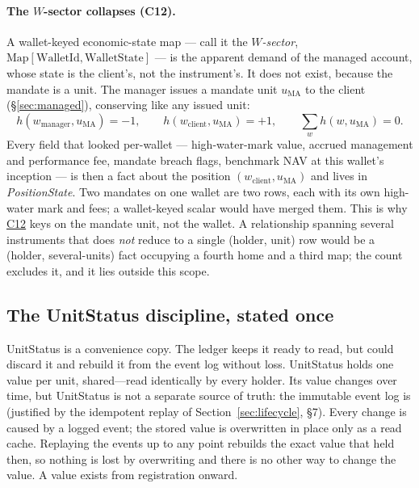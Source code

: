 \paragraph{The $W$-sector collapses (C12).}
A wallet-keyed economic-state map --- call it the \emph{$W$-sector},
$\mathrm{Map}[\mathrm{WalletId},\mathrm{WalletState}]$ --- is the apparent demand of the
managed account, whose state is the client's, not the instrument's. It does not exist,
because the mandate is a unit. The manager issues a mandate unit $u_{\mathrm{MA}}$ to the
client (\S\ref{sec:managed}), conserving like any issued unit:
\[
h(w_{\mathrm{manager}},u_{\mathrm{MA}})=-1,\qquad
h(w_{\mathrm{client}},u_{\mathrm{MA}})=+1,\qquad
\sum_{w}h(w,u_{\mathrm{MA}})=0 .
\]
Every field that looked per-wallet --- high-water-mark value, accrued management and
performance fee, mandate breach flags, benchmark NAV at this wallet's inception --- is then
a fact about the position $(w_{\mathrm{client}},u_{\mathrm{MA}})$ and lives in
\emph{PositionState}. Two mandates on one wallet are two rows, each with its own
high-water mark and fees; a wallet-keyed scalar would have merged them. This is why
\hyperref[cond:C12]{C12} keys on the mandate unit, not the wallet. A relationship spanning
several instruments that does \emph{not} reduce to a single (holder, unit) row would be a
(holder, several-units) fact occupying a fourth home and a third map; the count excludes
it, and it lies outside this scope.

\subsection{The UnitStatus discipline, stated once}
\label{sec:sec04-unitstatus}

UnitStatus is a convenience copy. The ledger keeps it ready to read, but could discard it
and rebuild it from the event log without loss. UnitStatus holds one value per unit,
shared---read identically by every holder. Its
value changes over time, but UnitStatus is not a separate source of truth: the immutable
event log is (justified by the idempotent replay of Section~\ref{sec:lifecycle}, \S7).
Every change is caused by a logged event; the stored value is overwritten in
place only as a read cache. Replaying the events up to any point rebuilds the exact value
that held then, so nothing is lost by overwriting and there is no other way to change the
value. A value exists from registration onward.

